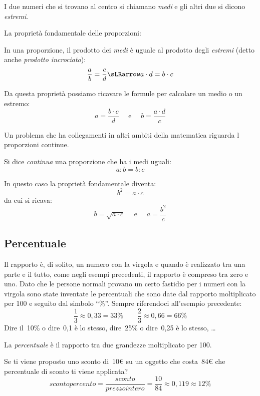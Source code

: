 I due numeri che si trovano al centro si chiamano \emph{medi} e gli altri 
due si dicono \emph{estremi}.

La proprietà fondamentale delle proporzioni:

\begin{teorema}{}{}
 In una proporzione, il prodotto dei \emph{medi} è uguale al prodotto 
degli \emph{estremi} (detto anche \emph{prodotto incrociato}):
\[\dfrac{a}{b} = \dfrac{c}{d} \sLRarrow a \cdot d = b \cdot c\]
\end{teorema}

Da questa proprietà possiamo ricavare le formule per calcolare un medio o 
un estremo:
\[a = \frac{b \cdot c}{d} \quad \text{ e } \quad 
  b = \frac{a \cdot d}{c}\]
  
Un problema che ha collegamenti in altri ambiti della matematica riguarda l 
proporzioni continue.

\begin{definizione}{}{}
 Si dice \emph{continua} una proporzione che ha i medi uguali:
 \[a : b = b : c\]
\end{definizione}

In questo caso la proprietà fondamentale diventa:
\[b^2 = a \cdot c\]
da cui si ricava:
\[b = \sqrt{a \cdot c} \quad \text{ e } \quad a = \frac{b^2}{c}\]

\subsection{Percentuale}

Il rapporto è, di solito, un numero con la virgola e 
quando è realizzato tra una parte e il tutto, come negli esempi precedenti, 
il rapporto è compreso tra zero e uno. Dato che le persone normali provano 
un certo fastidio per i numeri con la virgola sono state inventate le 
percentuali che sono date dal rapporto moltiplicato per 100 e seguito dal 
simbolo ``\%''. Sempre riferendoci all'esempio precedente:
\[\frac{1}{3} \approx 0,33 = 33\% \qquad 
  \frac{2}{3} \approx 0,66 = 66\%\]
Dire il~10\% o dire~0,1 è lo stesso, 
dire~25\% o dire~0,25 è lo stesso, \dots

\begin{definizione}{}{}
 La \emph{percentuale} è il rapporto tra due grandezze moltiplicato per 100.
\end{definizione}


\begin{esempio}{}{}
 Se ti viene proposto uno sconto di~10€ su un oggetto che costa~84€ che 
percentuale di sconto ti viene applicata?
\[sconto percento = \frac{sconto}{prezzointero}=\frac{10}{84} \approx
  0,119 \approx 12\%\]
\end{esempio}

